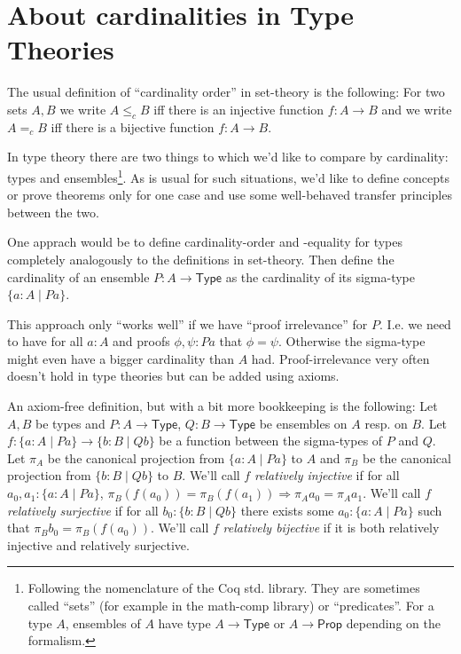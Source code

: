 \documentclass{article}
\begin{document}
\section{About cardinalities in Type Theories}
The usual definition of “cardinality order” in set-theory is the following:
For two sets $A, B$ we write $A \le_c B$ iff there is an injective function $f : A \to B$ and we write $A =_c B$ iff there is a bijective function $f : A \to B$.

In type theory there are two things to which we’d like to compare by cardinality: types and ensembles\footnote{
  Following the nomenclature of the Coq std. library.
  They are sometimes called “sets” (for example in the math-comp library) or “predicates”.
  For a type $A$, ensembles of $A$ have type $A \to \mathsf{Type}$ or $A \to \mathsf{Prop}$ depending on the formalism.}.
As is usual for such situations, we’d like to define concepts or prove theorems only for one case and use some well-behaved transfer principles between the two.

One apprach would be to define cardinality-order and -equality for types completely analogously to the definitions in set-theory.
Then define the cardinality of an ensemble $P : A \to \mathsf{Type}$ as the cardinality of its sigma-type $\{a : A \mid P a\}$.

This approach only “works well” if we have “proof irrelevance” for $P$. I.e. we need to have for all $a : A$ and proofs $\phi, \psi : P a$ that $\phi = \psi$.
Otherwise the sigma-type might even have a bigger cardinality than $A$ had.
Proof-irrelevance very often doesn’t hold in type theories but can be added using axioms.

An axiom-free definition, but with a bit more bookkeeping is the following:
Let $A, B$ be types and $P : A \to \mathsf{Type}$, $Q : B \to \mathsf{Type}$ be ensembles on $A$ resp. on $B$.
Let $f : \{ a : A \mid P a \} \to \{ b : B \mid Q b \}$ be a function between the sigma-types of $P$ and $Q$.
Let $\pi_A$ be the canonical projection from $\{ a : A \mid P a\}$ to $A$ and $\pi_B$ be the canonical projection from $\{ b : B \mid Q b \}$ to $B$.
We’ll call $f$ \emph{relatively injective} if for all $a_0, a_1 : \{ a : A \mid P a \}$, $\pi_B (f (a_0)) = \pi_B (f (a_1)) \Rightarrow \pi_A a_0 = \pi_A a_1$.
We’ll call $f$ \emph{relatively surjective} if for all $b_0 : \{ b : B \mid Q b \}$ there exists some $a_0 : \{ a : A \mid P a \}$ such that $\pi_B b_0 = \pi_B (f (a_0))$.
We’ll call $f$ \emph{relatively bijective} if it is both relatively injective and relatively surjective.
\end{document}
